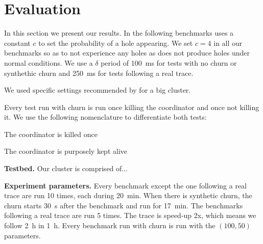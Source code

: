 
\section{Evaluation}
\label{sec:evaluation}
\tableaverage
{}\tableglobaltime
{}\tablelocaldeltas
{}\tablelocaltime
In this section we present our results. In the following benchmarks \epto uses a constant $c$ to set the probability of a hole appearing. We set $c = 4$ in all our benchmarks so as to not experience any holes as \jgroups does not produce holes under normal conditions. We use a $\delta$ period of \SI{100}{\milli\second} for tests with no churn or synthethic churn and \SI{250}{\milli\second} for tests following a real trace.
\par 
We used specific settings recommended by \jgroups for a big cluster.
\par
Every \jgroups test run with churn is run once killing the coordinator and once not killing it. We use the following nomenclature to differentiate both tests:
\begin{description}
	\item[\textbf{\jgroups-coord}:] The coordinator is killed once
	\item[\textbf{\jgroups-nocoord}:] The coordinator is purposely kept alive
\end{description}
\par
\textbf{Testbed.} Our cluster is comprised of... 
\par
\textbf{Experiment parameters.} Every benchmark except the one following a real trace are run 10 times, each during \SI{20}{\minute}. When there is synthetic churn, the churn starts \SI{30}{\second} after the benchmark and run for \SI{17}{\minute}. The benchmarks following a real trace are run 5 times. The trace is speed-up 2x, which means we follow \SI{2}{\hour} in \SI{1}{\hour}. Every benchmark run with churn is run with the $(100,50)$ parameters.

